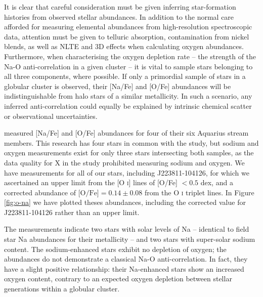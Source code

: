 \documentclass{emulateapj}
\begin{document}

It is clear that careful consideration must be given inferring star-formation histories from observed stellar abundances. In addition to the normal care afforded for measuring elemental abundances from high-resolution spectroscopic data, attention must be given to telluric absorption, contamination from nickel blends, as well as NLTE and 3D effects when calculating oxygen abundances. Furthermore, when characterising the oxygen depletion rate -- the strength of the Na-O anti-correlation in a given cluster -- it is vital to sample stars belonging to all three components, where possible. If only a primordial sample of stars in a globular cluster is observed, their [Na/Fe] and [O/Fe] abundances will be indistinguishable from halo stars of a similar metallicity. In such a scenario, any inferred anti-correlation could equally be explained by intrinsic chemical scatter or observational uncertainties.


\citet{wylie-de-boer;et-al_2012} measured [Na/Fe] and [O/Fe] abundances for four of their six Aquarius stream members. This research has four stars in common with the \citet{wylie-de-boer;et-al_2012} study, but sodium and oxygen measurements exist for only three stars intersecting both samples, as the data quality for X in the \citet{wylie-de-boer;et-al_2012} study prohibited measuring sodium and oxygen. We have measurements for all of our stars, including J223811-104126, for which we ascertained an upper limit from the [O \textsc{i}] lines of [O/Fe] $< 0.5$ dex, and a corrected abundance of $\mbox{[O/Fe]} = 0.14 \pm 0.08$ from the O \textsc{i} triplet lines. In Figure \ref{fig:o-na} we have plotted theses abundances, including the corrected value for J223811-104126 rather than an upper limit.



The \citet{wylie-de-boer;et-al_2012} measurements indicate two stars with solar levels of Na -- identical to field star Na abundances for their metallicity -- and two stars with super-solar sodium content. The sodium-enhanced stars exhibit no depletion of oxygen; the abundances do not demonstrate a classical Na-O anti-correlation. In fact, they have a slight positive relationship: their Na-enhanced stars show an increased oxygen content, contrary to an expected oxygen depletion between stellar generations within a globular cluster.  
\end{document}
